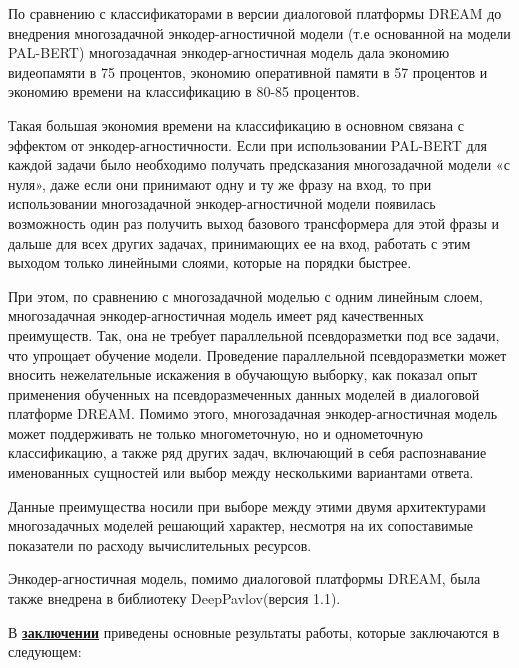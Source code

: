 По сравнению с классификаторами в версии диалоговой платформы DREAM до внедрения многозадачной энкодер-агностичной модели (т.е основанной на модели PAL-BERT) многозадачная энкодер-агностичная модель дала экономию видеопамяти в 75 процентов, экономию оперативной памяти в 57 процентов и экономию времени на классификацию в 80-85 процентов.
 
Такая большая экономия времени на классификацию в основном связана с эффектом от энкодер-агностичности. Если при использовании PAL-BERT для каждой задачи было необходимо получать предсказания многозадачной модели «с нуля», даже если они принимают одну и ту же фразу на вход, то при использовании многозадачной энкодер-агностичной модели появилась возможность один раз получить выход базового трансформера для этой фразы и дальше для всех других задачах, принимающих ее на вход, работать с этим выходом только линейными слоями, которые на порядки быстрее.

При этом, по сравнению с многозадачной моделью с одним линейным слоем, многозадачная энкодер-агностичная модель имеет ряд качественных преимуществ. Так, она не требует параллельной псевдоразметки под все задачи, что упрощает обучение модели. Проведение параллельной псевдоразметки может вносить нежелательные искажения в обучающую выборку, как показал опыт применения обученных на псевдоразмеченных данных моделей в диалоговой платформе DREAM. Помимо этого, многозадачная энкодер-агностичная модель может поддерживать не только многометочную, но и однометочную классификацию, а также ряд других задач, включающий в себя распознавание именованных сущностей или выбор между несколькими вариантами ответа.

Данные преимущества носили при выборе между этими двумя архитектурами многозадачных моделей решающий характер, несмотря на их сопоставимые показатели по расходу вычислительных ресурсов.

Энкодер-агностичная модель, помимо диалоговой платформы DREAM, была также внедрена в библиотеку DeepPavlov(версия 1.1).


В \underline{\textbf{заключении}} приведены основные результаты работы, которые заключаются в следующем:


